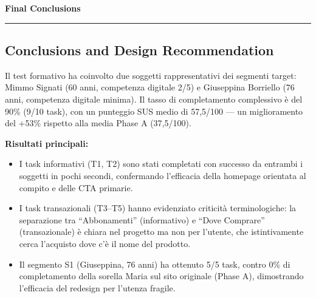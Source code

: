 ﻿\documentclass[11pt,a4paper]{article}
\begin{document}

\newpage
\begin{center}
  {\color{primaryColor}\large\bfseries Final Conclusions}
  \vspace{0.1cm}
  \color{borderColor}\hrule
\end{center}

\vspace{0.2cm}

\subsection*{Conclusions and Design Recommendation}
\begin{tcolorbox}[base]
Il test formativo ha coinvolto due soggetti rappresentativi dei segmenti
target: Mimmo Signati (60 anni, competenza digitale 2/5) e Giuseppina
Borriello (76 anni, competenza digitale minima). Il tasso di completamento
complessivo è del 90\% (9/10 task), con un punteggio SUS medio di
57,5/100 --- un miglioramento del +53\% rispetto alla media Phase A
(37,5/100).

\medskip

\noindent\textbf{Risultati principali:}
\begin{itemize}[leftmargin=*]
  \item I task informativi (T1, T2) sono stati completati con successo da
  entrambi i soggetti in pochi secondi, confermando l'efficacia della
  homepage orientata al compito e delle CTA primarie.
  \item I task transazionali (T3--T5) hanno evidenziato criticità
  terminologiche: la separazione tra ``Abbonamenti'' (informativo) e
  ``Dove Comprare'' (transazionale) è chiara nel progetto ma non per
  l'utente, che istintivamente cerca l'acquisto dove c'è il nome del
  prodotto.
  \item Il segmento S1 (Giuseppina, 76 anni) ha ottenuto 5/5 task,
  contro 0\% di completamento della sorella Maria sul sito originale
  (Phase A), dimostrando l'efficacia del redesign per l'utenza fragile.
\end{itemize}

\medskip


\end{tcolorbox}
\end{document}
